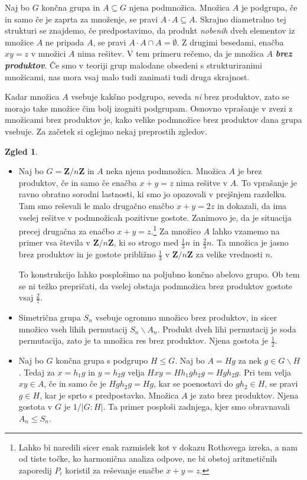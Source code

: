 \documentclass[11pt]{book}
\def\ZZ{\mathbf{Z}}
\def\definicija{\color{rdeca}\bf\em}
\theoremstyle{definition}
\theoremstyle{zgled}
\newtheorem*{zgled}{Zgled}
\theoremstyle{odprtproblem}
\theoremstyle{domacanaloga}
\theoremstyle{izrek}
\begin{document}
Naj bo $G$ končna grupa in $A \subseteq G$ njena podmnožica. Množica $A$ je podgrupa, če in samo če je zaprta za množenje, se pravi $A \cdot A \subseteq A$. Skrajno diametralno tej strukturi se znajdemo, če predpostavimo, da produkt \emph{nobenih} dveh elementov iz množice $A$ ne pripada $A$, se pravi $A \cdot A \cap A = \emptyset$. Z drugimi besedami, enačba $xy = z$ v množici $A$ nima rešitev. V tem primeru rečemo, da je množica $A$ {\definicija brez produktov}. Če smo v teoriji grup malodane obsedeni s strukturiranimi množicami, nas mora vsaj malo tudi zanimati tudi druga skrajnost. 

Kadar množica $A$ vsebuje kakšno podgrupo, seveda \emph{ni} brez produktov, zato se morajo take množice čim bolj izogniti podgrupam. Osnovno vprašanje v zvezi z množicami brez produktov je, kako velike podmnožice brez produktov dana grupa vsebuje. Za začetek si oglejmo nekaj preprostih zgledov.

\begin{zgled} \leavevmode
\begin{itemize}
\item Naj bo $G = \ZZ/n\ZZ$ in $A$ neka njena podmnožica. Množica $A$ je brez produktov, če in samo če enačba $x+y=z$ nima rešitve v $A$. To vprašanje je ravno obratno sorodni lastnosti, ki smo jo opazovali v prejšnjem razdelku. Tam smo reševali le malo drugačno enačbo $x+y=2z$ in dokazali, da ima vselej rešitve v podmnožicah pozitivne gostote. Zanimovo je, da je situacija precej drugačna za enačbo $x+y = z$.\footnote{Lahko bi naredili sicer enak razmislek kot v dokazu Rothovega izreka, a nam od tiste točke, ko harmonična analiza odpove, ne bi obstoj aritmetičnih zaporedij $P_i$ koristil za reševanje enačbe $x+y=z$.} Za množico $A$ lahko vzamemo na primer vsa števila v $\ZZ/n\ZZ$, ki so strogo med $\frac{1}{3}n$ in $\frac{2}{3}n$. Ta množica je jasno brez produktov in je gostote približno $\frac{1}{3}$ v $\ZZ/n\ZZ$ za velike vrednosti $n$. 

To konstrukcijo lahko posplošimo na poljubno končno abelovo grupo. Ob tem se ni težko prepričati, da vselej obstaja podmnožica brez produktov gostote vsaj $\frac{2}{7}$.

\item Simetrična grupa $S_n$ vsebuje ogromno množico brez produktov, in sicer množico vseh lihih permutacij $S_n \backslash A_n$. Produkt dveh lihi permutacij je soda permutacija, zato je ta množica res brez produktov. Njena gostota je $\frac12$.

\item Naj bo $G$ končna grupa s podgrupo $H \leq G$. Naj bo $A = Hg$ za nek $g \in G \backslash H$. Tedaj za $x = h_1 g$ in $y = h_2 g$ velja $Hxy = Hh_1 g h_2 g = H g h_2 g$. Pri tem velja $xy \in A$, če in samo če je $H g h_2 g = Hg$, kar se poenostavi do $g h_2 \in H$, se pravi $g \in H$, kar je sprto s predpostavko. Množica $A$ je zato brez produktov. Njena gostota v $G$ je $1/|G:H|$. Ta primer posploši zadnjega, kjer smo obravnavali $A_n \leq S_n$.
\end{itemize}
\end{zgled}
\end{document}
